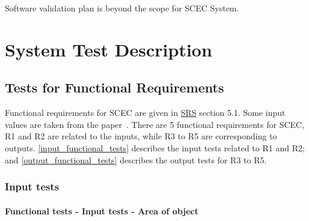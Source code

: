 \documentclass[12pt, titlepage]{article}
\begin{document}
Software validation plan is beyond the scope for SCEC System.

\section{System Test Description}
\label{systemtests}
	
\subsection{Tests for Functional Requirements}

Functional requirements for SCEC are given in \href{https://github.com/DeeshaPatel/CAS-741-Solar-Cooker/blob/7c53c8d9a19ca2f94dfba6ba9208eae0bf03b8cc/docs/SRS/SRS.pdf}{SRS} section 5.1. Some input values are taken from the paper~\cite{MathsModel}. There are 5 functional requirements for SCEC, R1 and R2 are related to the inputs, while R3 to R5 are corresponding to outputs. \autoref{input_functional_tests} describes the input tests related to R1 and R2; and \autoref{output_functional_tests} describes the output tests for R3 to R5.        

\subsubsection{Input tests}
\label{input_functional_tests}

\paragraph{Functional tests - Input tests - Area of object}
\end{document}
